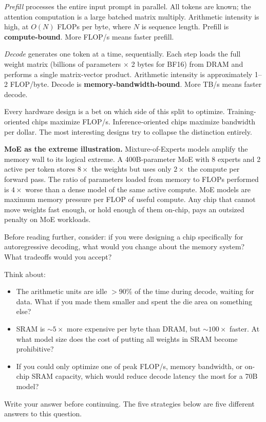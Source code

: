 \textit{Prefill} processes the entire input prompt in parallel. All tokens are known; the attention computation is a large batched matrix multiply. Arithmetic intensity is high, at $O(N)$ FLOPs per byte, where $N$ is sequence length. Prefill is \textbf{compute-bound}. More FLOP/s means faster prefill.

\textit{Decode} generates one token at a time, sequentially. Each step loads the full weight matrix (billions of parameters $\times$ 2 bytes for BF16) from DRAM and performs a single matrix-vector product. Arithmetic intensity is approximately 1--2 FLOP/byte. Decode is \textbf{memory-bandwidth-bound}. More TB/s means faster decode.

Every hardware design is a bet on which side of this split to optimize. Training-oriented chips maximize FLOP/s. Inference-oriented chips maximize bandwidth per dollar. The most interesting designs try to collapse the distinction entirely.

\textbf{MoE as the extreme illustration.} Mixture-of-Experts models amplify the memory wall to its logical extreme. A 400B-parameter MoE with 8 experts and 2 active per token stores $8\times$ the weights but uses only $2\times$ the compute per forward pass. The ratio of parameters loaded from memory to FLOPs performed is $4\times$ worse than a dense model of the same active compute. MoE models are maximum memory pressure per FLOP of useful compute. Any chip that cannot move weights fast enough, or hold enough of them on-chip, pays an outsized penalty on MoE workloads.

\begin{thinkfirst}
Before reading further, consider: if you were designing a chip specifically for autoregressive decoding, what would you change about the memory system? What tradeoffs would you accept?

Think about:
\begin{itemize}
  \item The arithmetic units are idle $>90\%$ of the time during decode, waiting for data. What if you made them smaller and spent the die area on something else?
  \item SRAM is $\sim$$5\times$ more expensive per byte than DRAM, but $\sim$$100\times$ faster. At what model size does the cost of putting all weights in SRAM become prohibitive?
  \item If you could only optimize one of peak FLOP/s, memory bandwidth, or on-chip SRAM capacity, which would reduce decode latency the most for a 70B model?
\end{itemize}
Write your answer before continuing. The five strategies below are five different answers to this question.
\end{thinkfirst}

